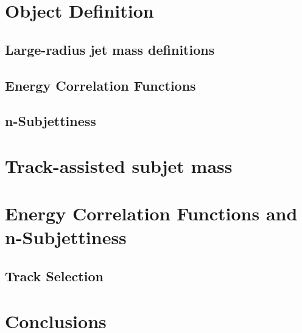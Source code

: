 \documentclass[UKenglish,texlive=2013]{\ATLASLATEXPATH atlasdoc}
\begin{document}
\section{Object Definition}
\label{sec:objdef}

\subsection{Large-radius jet mass definitions}

\subsection{Energy Correlation Functions}


\subsection{n-Subjettiness}


\section{Track-assisted subjet mass}
\label{sec:mtas}


\section{Energy Correlation Functions and n-Subjettiness}
\subsection{Track Selection}

\label{sec:ECFnS}



\section{Conclusions}
\label{sec:conclusions}
\end{document}
